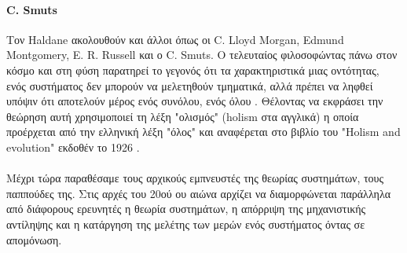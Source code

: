 \documentclass[a4paper,12pt,twoside]{report}
\begin{document}
{			\paragraph{C. Smuts}{Τον Haldane ακολουθούν και άλλοι όπως οι C. Lloyd Morgan, Edmund Montgomery, E. R. Russell και ο C. Smuts. Ο τελευταίος φιλοσοφώντας πάνω στον κόσμο και στη φύση παρατηρεί το γεγονός ότι τα χαρακτηριστικά μιας οντότητας, ενός συστήματος δεν μπορούν να μελετηθούν τμηματικά, αλλά πρέπει να ληφθεί υπόψιν ότι αποτελούν μέρος ενός συνόλου, ενός όλου \cite[ενότητα : 31.1 Systems science]{SystemsThinking:STRIJBOS2010} \cite{BeforeTheWhiteManWasMaster:Marks2000}. Θέλοντας να εκφράσει την θεώρηση αυτή χρησιμοποιεί τη λέξη "ολισμός" (holism στα αγγλικά) η οποία προέρχεται από την ελληνική λέξη "όλος" και αναφέρεται στο βιβλίο του "Holism and evolution" εκδοθέν το 1926 \cite{HolismAndEvolution:Smuts1926}.
			}
			\paragraph{}{Μέχρι τώρα παραθέσαμε τους αρχικούς εμπνευστές της θεωρίας συστημάτων, τους παππούδες της. Στις αρχές του 20ού ου αιώνα αρχίζει να διαμορφώνεται παράλληλα από διάφορους ερευνητές η θεωρία συστημάτων, η απόρριψη της μηχανιστικής αντίληψης και η κατάργηση της μελέτης των μερών ενός συστήματος όντας σε απομόνωση.
			}
}
\end{document}
